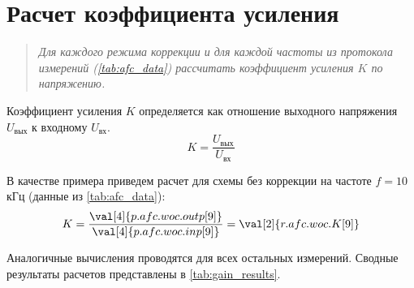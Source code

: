 
\section*{  Расчет коэффициента усиления}
\begin{quote}
    \textit{Для каждого режима коррекции и для каждой частоты из протокола измерений (\cref{tab:afc_data}) рассчитать коэффициент усиления $K$ по напряжению.}
\end{quote}

Коэффициент усиления $K$ определяется как отношение выходного напряжения $U_\text{вых}$ к входному $U_\text{вх}$.
\begin{equation}
    K = \frac{U_\text{вых}}{U_\text{вх}}
    \label{eq:gain}
\end{equation}

В качестве примера приведем расчет для схемы без коррекции на частоте $f = 10$ кГц (данные из \cref{tab:afc_data}):
\begin{equation}
    K = \frac{\val[4]{p.afc.woc.outp[9]}}{\val[4]{p.afc.woc.inp[9]}} = \val[2]{r.afc.woc.K[9]}
\end{equation}

Аналогичные вычисления проводятся для всех остальных измерений. Сводные результаты расчетов представлены в \cref{tab:gain_results}.

